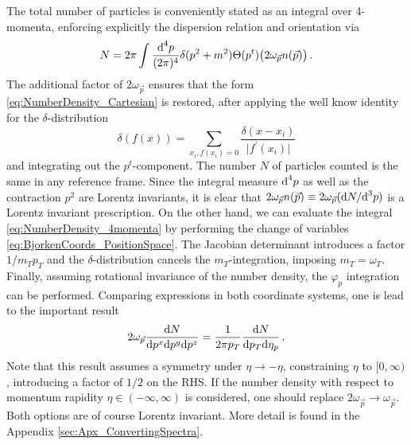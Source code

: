The total number of particles is conveniently stated as an integral over 4-momenta, enforcing explicitly the dispersion relation and orientation via 
\begin{equation}
    N=2\pi\int\frac{\text{d}^4p}{(2\pi)^4}\delta(p^2+m^2)\Theta(p^t)\big(2\omega_{\vec{p}}n(\vec{p})\big)\,.
    \label{eq:NumberDensity_4momenta}
\end{equation}
The additional factor of $2\omega_{\vec{p}}$ ensures that the form \eqref{eq:NumberDensity_Cartesian} is restored, after applying the well know identity for the $\delta$-distribution
\begin{equation}
    \delta(f(x))=\sum_{x_i, f(x_i)=0}\frac{\delta(x-x_i)}{\vert f^\prime(x_i)\vert}
\end{equation}
and integrating out the $p^t$-component. The number $N$ of particles counted is the same in any reference frame. Since the integral measure $\text{d}^4p$ as well as the contraction $p^2$ are Lorentz invariants, it is clear that ${2\omega_{\vec{p}}n(\vec{p})\equiv 2\omega_{\vec{p}}(\text{d} N/\text{d}^3p)}$ is a Lorentz invariant prescription. On the other hand, we can evaluate the integral \eqref{eq:NumberDensity_4momenta} by performing the change of variables \eqref{eq:BjorkenCoords_PositionSpace}. The Jacobian determinant introduces a factor ${1/m_Tp_T}$ and the $\delta$-distribution cancels the $m_T$-integration, imposing $m_T=\omega_T$. Finally, assuming rotational invariance of the number density, the $\varphi_p$ integration can be performed. Comparing expressions in both coordinate systems, one is lead to the important result
\begin{equation}
    2\omega_{\vec{p}}\frac{\text{d} N}{\text{d} p^x\text{d} p^y\text{d} p^z}=\frac{1}{2\pi p_T}\frac{\text{d} N}{\text{d} p_T\text{d} \eta_p}\,.
    \label{eq:SpectraConversion}
\end{equation}
Note that this result assumes a symmetry under ${\eta\to-\eta}$, constraining $\eta$ to ${[0,\infty)}$, introducing a factor of $1/2$ on the RHS. If the number density with respect to momentum rapidity ${\eta\in(-\infty,\infty)}$ is considered, one should replace ${2\omega_{\vec{p}}\to\omega_{\vec{p}}}$. Both options are of course Lorentz invariant. More detail is found in the Appendix \ref{sec:Apx_ConvertingSpectra}.
